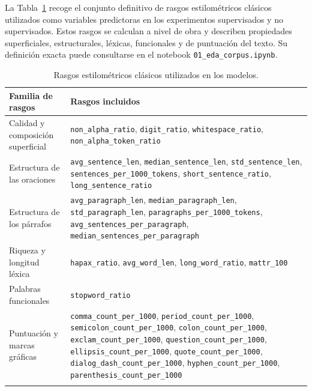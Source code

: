 \documentclass[IB]{TFUOC}%
\begin{document}
La Tabla~\ref{tab:rasgos-clasicos} recoge el conjunto definitivo de rasgos estilométricos clásicos utilizados como variables predictoras en los experimentos supervisados y no supervisados. Estos rasgos se calculan a nivel de obra y describen propiedades superficiales, estructurales, léxicas, funcionales y de puntuación del texto. Su definición exacta puede consultarse en el notebook \texttt{01\_eda\_corpus.ipynb}.

\begin{longtable}{|p{5cm}|>{\raggedright\arraybackslash}p{10.8cm}|}
\hline
\textbf{Familia de rasgos} & \textbf{Rasgos incluidos} \\
\hline

Calidad y composición superficial &
\texttt{non\_alpha\_ratio}, \texttt{digit\_ratio}, \texttt{whitespace\_ratio}, \texttt{non\_alpha\_token\_ratio} \\
\hline

Estructura de las oraciones &
\texttt{avg\_sentence\_len}, \texttt{median\_sentence\_len}, \texttt{std\_sentence\_len}, \texttt{sentences\_per\_1000\_tokens}, \texttt{short\_sentence\_ratio}, \texttt{long\_sentence\_ratio} \\
\hline

Estructura de los párrafos &
\texttt{avg\_paragraph\_len}, \texttt{median\_paragraph\_len}, \texttt{std\_paragraph\_len}, \texttt{paragraphs\_per\_1000\_tokens}, \texttt{avg\_sentences\_per\_paragraph}, \texttt{median\_sentences\_per\_paragraph} \\
\hline

Riqueza y longitud léxica &
\texttt{hapax\_ratio}, \texttt{avg\_word\_len}, \texttt{long\_word\_ratio}, \texttt{mattr\_100} \\
\hline

Palabras funcionales &
\texttt{stopword\_ratio} \\
\hline

Puntuación y marcas gráficas &
\texttt{comma\_count\_per\_1000}, \texttt{period\_count\_per\_1000}, \texttt{semicolon\_count\_per\_1000}, \texttt{colon\_count\_per\_1000}, \texttt{exclam\_count\_per\_1000}, \texttt{question\_count\_per\_1000}, \texttt{ellipsis\_count\_per\_1000}, \texttt{quote\_count\_per\_1000}, \texttt{dialog\_dash\_count\_per\_1000}, \texttt{hyphen\_count\_per\_1000}, \texttt{parenthesis\_count\_per\_1000} \\
\hline

\caption{Rasgos estilométricos clásicos utilizados en los modelos.}
\label{tab:rasgos-clasicos}
\end{longtable}
\end{document}
